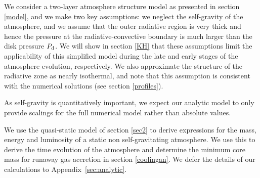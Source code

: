 \documentclass[apj]{emulateapj}
\newcommand{\App}[1]{Appendix~\ref{#1}}
\newcommand{\di}{_{\rm d}}
\begin{document}
We consider a two-layer atmosphere structure model as presented in section \ref{model}, and we make two key assumptions: we neglect the self-gravity of the atmosphere, and we assume that the outer radiative region is very thick and hence the pressure at the radiative-convective boundary is much larger than the disk pressure $P\di$. We will show in section \ref{KH} that these assumptions limit the applicability of this simplified model during the late and early stages of the atmosphere evolution, respectively. We also approximate the structure of the radiative zone as nearly isothermal, and note that this assumption is consistent with the numerical solutions (see section \ref{profiles}). 

As self-gravity is quantitatively important, we expect our analytic model to only provide scalings for the full numerical model rather than absolute values.



We use the quasi-static model of section \ref{sec2} to derive expressions for the mass, energy and luminosity of a static non self-gravitating atmosphere. We use this to derive the time evolution of the atmosphere and determine the minimum core mass for runaway gas accretion in section \ref{coolingan}. We defer the details of our calculations to \App{sec:analytic}.





\end{document}
